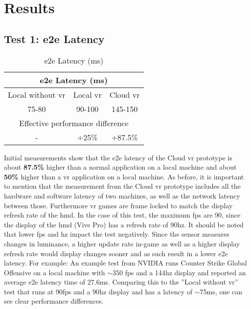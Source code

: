 \section{Results}

\subsection{Test 1: \acrfull{e2e} Latency}
\label{sec:res:t1}
\begin{table}[h!]
\begin{center}
\caption{\acrfull{e2e} Latency (ms)}
\begin{tabular}{ |c|c|c| }
\hline
\multicolumn{3}{|c|}{\acrfull{e2e} Latency (\acrshort{ms})}\\
\hline
\hline
Local without \acrshort{vr} & Local \acrshort{vr} & Cloud \acrshort{vr}\\
\hline
75-80 & 90-100 & 145-150\\
\hline
\multicolumn{3}{|c|}{Effective performance difference}\\
\hline
- & +25\% & +87.5\%\\
\hline
\end{tabular}
\end{center}
\end{table}

Initial measurements show that the \acrshort{e2e} latency of the Cloud \acrshort{vr} prototype is about \textbf{87.5\%} higher than a normal application on a local machine and about \textbf{50\%} higher than a \acrshort{vr} application on a local machine. As before, it is important to mention that the measurement from the Cloud \acrshort{vr}
 prototype includes all the hardware and software latency of two machines, as well as the network latency between those. Furthermore \acrshort{vr} games are frame locked to match the display refresh rate of the \acrshort{hmd}. In the case of this test, the maximum \acrshort{fps} are 90, since the display of the \acrfull{hmd} (Vive Pro) has a refresh rate of 90\acrshort{hz}. 
 It should be noted that lower \acrshort{fps} and \acrshort{hz} impact the test negatively. Since the sensor measures changes in luminance, a higher update rate in-game as well as a higher display refresh rate would display changes sooner and as such result in a lower \acrshort{e2e} latency. For example: An example test from NVIDIA runs Counter Strike Global Offensive on a local machine with $\sim$350 \acrshort{fps} and a 144\acrshort{hz} display and reported an average \acrshort{e2e} latency time of 27.6\acrshort{ms}. Comparing this to the ''Local without \acrshort{vr}'' test that runs at 90\acrshort{fps} and a 90\acrshort{hz} display and has a latency of $\sim$75\acrshort{ms}, one can see clear performance differences.
 
